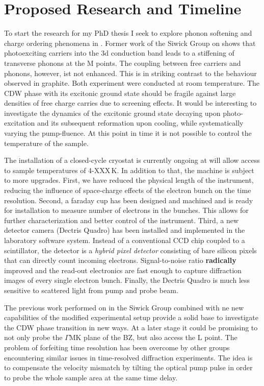 \section{Proposed Research and Timeline}
To start the research for my PhD thesis I seek to explore phonon softening and charge ordering phenomena in \ts.
Former work of the Siwick Group on \ts\space shows that photoexciting carriers into the 3d conduction band leads to a stiffening of transverse phonons at the M points\cite{otto2021}.
The coupling between free carriers and phonons, however, ist not enhanced.
This is in striking contrast to the behaviour observed in graphite\cite{stern2018}.
Both experiment were conducted at room temperature.
The \ac{CDW} phase with its excitonic ground state should be fragile against large densities of free charge carries due to screening effects.
It would be interesting to investigate the dynamics of the excitonic ground state decaying upon photo-excitation and its subsequent reformation upon cooling, while systematically varying the pump-fluence.
At this point in time it is not possible to control the temperature of the sample.

The installation of a closed-cycle cryostat is currently ongoing at will allow access to sample temperatures of 4-XXX\,K.
In addition to that, the machine is subject to more upgrades.
First, we have reduced the physical length of the instrument, reducing the influence of space-charge effects of the electron bunch on the time resolution.
Second, a faraday cup has been designed and machined and is ready for installation to measure number of electrons in the bunches.
This allows for further characterization and better control of the instrument.
Third, a new detector camera (Dectris Quadro) has been installed and implemented in the laboratory software system.
Instead of a conventional CCD chip coupled to a scintillator, the detector is a \emph{hybrid pixel detector} consisting of bare silicon pixels that can directly count incoming electrons.
Signal-to-noise ratio \textbf{radically} improved and the read-out electronics are fast enough to capture diffraction images of every single electron bunch.
Finally, the Dectris Quadro is much less sensitive to scattered light from pump and probe beam.

The previous work performed on \ts\space in the Siwick Group combined with ne new capabilities of the modified experimental setup provide a solid base to investigate the \ac{CDW} phase transition in new ways.
At a later stage it could be promising to not only probe the $\Gamma\mathrm{MK}$ plane of the \ac{BZ}, but also access the L point.
The problem of forfeiting time resolution has been overcome by other groups encountering similar issues in time-resolved diffraction experiments.
The idea is to compensate the velocity mismatch by tilting the optical pump pulse in order to probe the whole sample area at the same time delay\cite{baum2006,zhou2013}.

